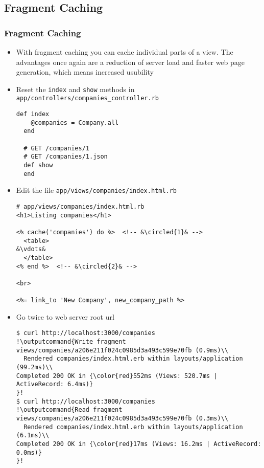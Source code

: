 \documentclass{beamer}
\newcommand*\circled[1]{\tikz[baseline=(char.base)]{
            \node[shape=circle,draw,inner sep=2pt] (char) {#1};}}
\newcommand{\outputcommand}[1]{\color{darkgreen}{#1}}
\begin{document}
\subsection{Fragment Caching}
\begin{frame}
\frametitle{Fragment Caching}
\begin{itemize}
\item With fragment caching you can cache individual parts of a view. The advantages once again are a reduction of server load and faster web page generation, which means increased usubility

\item Reset the \texttt{index} and \texttt{show} methods in \texttt{app/controllers/companies\_controller.rb}
\lstset{language=Ruby, style=eclipse}
\begin{lstlisting}[escapechar=&]
def index
    @companies = Company.all
  end

  # GET /companies/1
  # GET /companies/1.json
  def show
  end
\end{lstlisting}

\item Edit the file \texttt{app/views/companies/index.html.rb}
\lstset{language=Ruby, style=eclipse}
\begin{lstlisting}[escapechar=&]
# app/views/companies/index.html.rb
<h1>Listing companies</h1>

<% cache('companies') do %>  <!-- &\circled{1}& -->
  <table>
&\vdots&
  </table>
<% end %>  <!-- &\circled{2}& -->

<br>

<%= link_to 'New Company', new_company_path %>
\end{lstlisting}

\item Go twice to web server root url
\lstset{language=shell}
\begin{lstlisting}[escapechar=!]
$ curl http://localhost:3000/companies
!\outputcommand{Write fragment views/companies/a206e211f024c0985d3a493c599e70fb (0.9ms)\\
  Rendered companies/index.html.erb within layouts/application (99.2ms)\\
Completed 200 OK in {\color{red}552ms (Views: 520.7ms | ActiveRecord: 6.4ms)}
}!
$ curl http://localhost:3000/companies
!\outputcommand{Read fragment views/companies/a206e211f024c0985d3a493c599e70fb (0.3ms)\\
  Rendered companies/index.html.erb within layouts/application (6.1ms)\\
Completed 200 OK in {\color{red}17ms (Views: 16.2ms | ActiveRecord: 0.0ms)}
}!
\end{lstlisting}


\end{itemize}
\end{frame}
\end{document}
